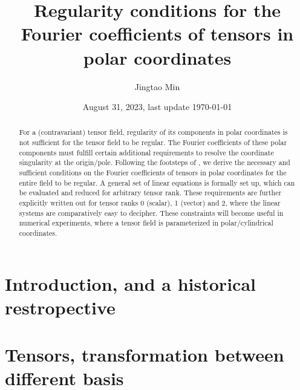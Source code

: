 \documentclass[a4paper, 11pt]{article}
\title{Regularity conditions for the Fourier coefficients of tensors in polar coordinates}
\author{Jingtao Min}
\date{August 31, 2023, last update \today}
\begin{document}
\maketitle

\begin{abstract}
    For a (contravariant) tensor field, regularity of its components in polar coordinates is not sufficient for the tensor field to be regular. The Fourier coefficients of these polar components must fulfill certain additional requirements to resolve the coordinate singularity at the origin/pole. Following the footsteps of \textcite{lewis_physical_1990}, we derive the necessary and sufficient conditions on the Fourier coefficients of tensors in polar coordinates for the entire field to be regular. A general set of linear equations is formally set up, which can be evaluated and reduced for arbitrary tensor rank. These requirements are further explicitly written out for tensor ranks 0 (scalar), 1 (vector) and 2, where the linear systems are comparatively easy to decipher. These constraints will become useful in numerical experiments, where a tensor field is parameterized in polar/cylindrical coordinates.
\end{abstract}

\section{Introduction, and a historical restropective}

\section{Tensors, transformation between different basis}
\end{document}
